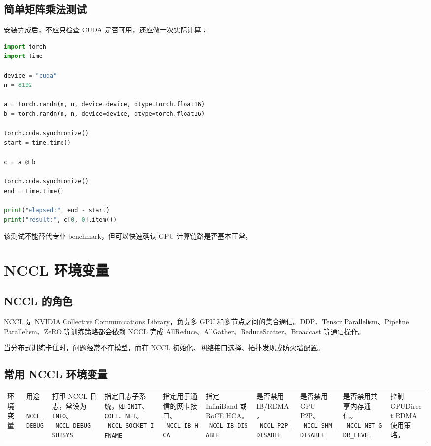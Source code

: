 \subsection{简单矩阵乘法测试}

安装完成后，不应只检查 CUDA 是否可用，还应做一次实际计算：

\begin{lstlisting}[language=Python,caption={PyTorch GPU 矩阵乘法测试},label={lst:pytorch-matmul-test}]
import torch
import time

device = "cuda"
n = 8192

a = torch.randn(n, n, device=device, dtype=torch.float16)
b = torch.randn(n, n, device=device, dtype=torch.float16)

torch.cuda.synchronize()
start = time.time()

c = a @ b

torch.cuda.synchronize()
end = time.time()

print("elapsed:", end - start)
print("result:", c[0, 0].item())
\end{lstlisting}

该测试不能替代专业 benchmark，但可以快速确认 GPU 计算链路是否基本正常。

\section{NCCL 环境变量}

\subsection{NCCL 的角色}

NCCL 是 NVIDIA Collective Communications Library，负责多 GPU 和多节点之间的集合通信。DDP、Tensor Parallelism、Pipeline Parallelism、ZeRO 等训练策略都会依赖 NCCL 完成 AllReduce、AllGather、ReduceScatter、Broadcast 等通信操作。

当分布式训练卡住时，问题经常不在模型，而在 NCCL 初始化、网络接口选择、拓扑发现或防火墙配置。

\subsection{常用 NCCL 环境变量}

\begin{longtable}{p{}p{}}
\toprule
环境变量 & 用途 \
\midrule
\texttt{NCCL_DEBUG} & 打印 NCCL 日志，常设为 \texttt{INFO}。 \
\texttt{NCCL_DEBUG_SUBSYS} & 指定日志子系统，如 \texttt{INIT}、\texttt{COLL}、\texttt{NET}。 \
\texttt{NCCL_SOCKET_IFNAME} & 指定用于通信的网卡接口。 \
\texttt{NCCL_IB_HCA} & 指定 InfiniBand 或 RoCE HCA。 \
\texttt{NCCL_IB_DISABLE} & 是否禁用 IB/RDMA。 \
\texttt{NCCL_P2P_DISABLE} & 是否禁用 GPU P2P。 \
\texttt{NCCL_SHM_DISABLE} & 是否禁用共享内存通信。 \
\texttt{NCCL_NET_GDR_LEVEL} & 控制 GPUDirect RDMA 使用策略。 \
\bottomrule
\end{longtable}

